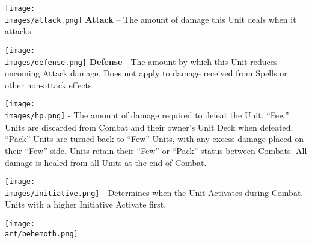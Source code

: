 \begin{multicols}{2}

\vspace{0pt}

\texttt{[image: \\images/attack.png]} \textbf{Attack} – The amount of damage this Unit deals when it attacks.\par
\texttt{[image: \\images/defense.png]} \textbf{Defense} - The amount by which this Unit reduces oncoming Attack damage.
Does not apply to damage received from Spells or other non-attack effects.\par
\texttt{[image: \\images/hp.png]} \textbf{} - The amount of damage required to defeat the Unit.
``Few'' Units are discarded from Combat and their owner's Unit Deck when defeated.
``Pack'' Units are turned back to ``Few'' Units, with any excess damage placed on their ``Few'' side.
Units retain their ``Few'' or ``Pack'' status between Combats.
All damage is healed from all Units at the end of Combat.\par
\texttt{[image: \\images/initiative.png]}{} - Determines when the Unit Activates during Combat.
Units with a higher Initiative Activate first.

\vfill
\hspace{-2em}
{\texttt{[image: \\art/behemoth.png]}}


\end{multicols}
